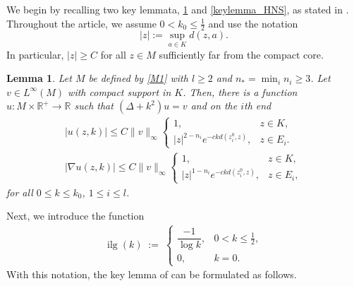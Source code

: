 \documentclass[12pt]{amsart}
\newtheorem{lemma}[theorem]{Lemma}
\begin{document}
We begin by recalling two key lemmata, \ref{keylemma_HS} and \ref{keylemma_HNS}, as stated in \cite{HS,HNS}.  
Throughout the article, we assume $0<k_0 \leq \tfrac{1}{2}$ and use the notation
\[
|z| := \sup_{a \in K} d(z,a).
\]
In particular, $|z| \geq C$ for all $z \in M$ sufficiently far from the compact core.


\begin{lemma}\cite[Lemma~2.7]{HS}\label{keylemma_HS}
Let $M$ be defined by \eqref{M1} with $l\ge 2$ and $n_* = \min_i n_i \ge 3$. Let $v \in L^{\infty}(M)$ with compact support in $K$. Then, there is a function $u: M \times \mathbb{R}^+ \to  \mathbb{R}$ such that $(\Delta + k^2)u = v$ and on the $i$th end
\begin{gather*}\label{2.7e}
|u(z, k)| \le  C \|v\|_\infty \begin{cases}
    1, & z\in K,\\
    |z|^{2-n_i} e^{- ck d(z_i^0, z)}, & z \in  E_i.
\end{cases}
\\
|\nabla u(z, k)| \le  C \|v\|_\infty \begin{cases}
    1, & z\in K,\\
    |z|^{1-n_i} e^{- ck d(z_i^0, z)}, & z\in E_i,
\end{cases}
\end{gather*}
for all $0\le k\le k_0$, $1\le i\le l$. 

\end{lemma}

Next, we introduce the function
\begin{align*}
    \operatorname{ilg}(k) \;:=\; 
    \begin{cases}
        \dfrac{-1}{\log k}, & 0<k \leq \tfrac{1}{2}, \\[6pt]
        0, & k=0.
    \end{cases}
\end{align*}
With this notation, the key lemma of \cite{HNS} can be formulated as follows.
\end{document}
